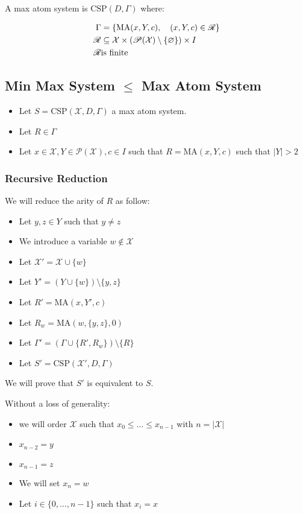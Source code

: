 A max atom system is $\text{CSP}(D,\Gamma)$ where:

\begin{align*}
	\Gamma&=\left\{\text{MA}(x,Y,c),\quad (x,Y,c)\in \mathscr{R}\right\}\\
	\mathscr{R}&\subseteq \mathcal{X}\times \left(\mathscr{P}(\mathcal{X}) \setminus \{\varnothing\}\right)\times I \\
	\mathscr{R}&\space \text{is finite}
\end{align*}

\subsection{Min Max System $\le$ Max Atom System}
\begin{itemize}
	\item Let $S=\text{CSP}(\mathcal{X},D,\Gamma)$ a max atom system.
	\item Let $R\in \Gamma$
	\item Let $x\in \mathcal{X},Y\in\mathscr{P}(\mathcal{X}),c\in I$ such that $R=\text{MA}(x,Y,c)$ such that $\lvert Y \rvert >2$
\end{itemize}

\subsubsection{Recursive Reduction}
We will reduce the arity of $R$ as follow:
\begin{itemize}
	\item Let $y,z\in Y$ such that $y\ne z$
	\item We introduce a variable $w\notin \mathcal{X}$
	\item Let $\mathcal{X}'=\mathcal{X}\cup\{w\}$
	\item Let $Y'=(Y\cup \{w\})\setminus\{y,z\}$
	\item Let $R'=\text{MA}(x,Y',c)$
	\item Let $R_w=\text{MA}(w,\{y,z\},0)$
	\item Let $\Gamma'=(\Gamma\cup\{R',R_w\})\setminus \{R\}$
	\item Let $S'=\text{CSP}(\mathcal{X}',D,\Gamma)$
\end{itemize}


We will prove that $S'$ is equivalent to $S.$

Without a loss of generality:
\begin{itemize}
	\item we will order $\mathcal{X}$ such that $x_0\le\dots\le x_{n-1}$ with $n=\lvert \mathcal{X}\rvert$ 
	\item $x_{n-2}=y$
	\item $x_{n-1}=z$
	\item We will set $x_n=w$
	\item Let $i\in\{0,\dots,n-1\}$ such that $x_i=x$
\end{itemize}


